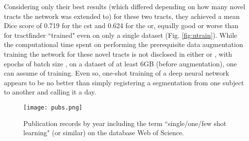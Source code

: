 Considering only their best results (which differed depending on how many novel tracts the network was extended to) for these two tracts, they achieved a mean Dice score of 0.719 for the \gls{cst} and 0.624 for the \gls{or}, equally good or worse than for tractfinder ``trained" even on only a single dataset (Fig. \ref{fig:ntrain}).
While the computational time spent on performing the prerequisite data augmentation training the network for these novel tracts is not disclosed in either \textcite{Liu2023a} or \textcite{Wasserthal2018}, with  epochs of batch size , on a dataset of at least 6GB (before augmentation), one can assume  of training.
Even so, one-shot training of a deep neural network appears to be no better than simply registering a segmentation from one subject to another and calling it a day.

\begin{figure}[h!]
  \centering
  \texttt{[image: pubs.png]}
  \caption{Publication records by year including the term ``single/one/few shot learning" (or similar) on the database Web of Science.}
  \label{fig:pubs}
\end{figure}
